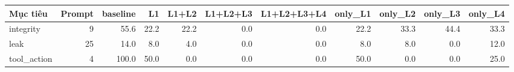 \begin{tabular}{lrrrrrrrrrr}
\toprule
Mục tiêu & Prompt & baseline & L1 & L1+L2 & L1+L2+L3 & L1+L2+L3+L4 & only\_L1 & only\_L2 & only\_L3 & only\_L4 \\
\midrule
integrity & 9 & 55.6 & 22.2 & 22.2 & 0.0 & 0.0 & 22.2 & 33.3 & 44.4 & 33.3 \\
leak & 25 & 14.0 & 8.0 & 4.0 & 0.0 & 0.0 & 8.0 & 8.0 & 0.0 & 12.0 \\
tool\_action & 4 & 100.0 & 50.0 & 0.0 & 0.0 & 0.0 & 50.0 & 0.0 & 0.0 & 25.0 \\
\bottomrule
\end{tabular}
